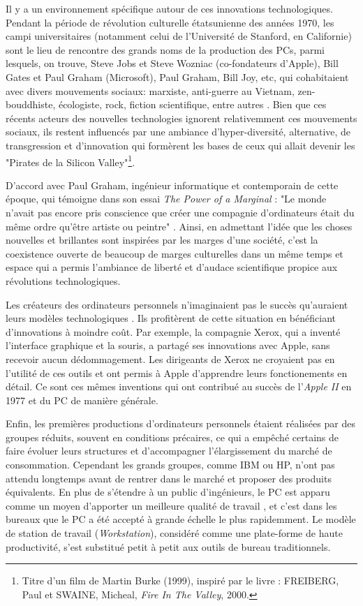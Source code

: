 Il y a un environnement spécifique autour de ces innovations technologiques. Pendant la période de révolution culturelle étatsunienne des années 1970, les campi universitaires (notamment celui de l'Université de Stanford, en Californie) sont le lieu de rencontre des grands noms de la production des PCs, parmi lesquels, on trouve, Steve Jobs et Steve Wozniac (co-fondateurs d'Apple), Bill Gates et Paul Graham (Microsoft), Paul Graham, Bill Joy, etc, qui cohabitaient avec divers mouvements sociaux: marxiste, anti-guerre au Vietnam, zen-bouddhiste, écologiste, rock, fiction scientifique, entre autres \citep{Breton1990}. Bien que ces récents acteurs des nouvelles technologies ignorent relativemment ces mouvements sociaux, ils restent influencés par une ambiance d'hyper-diversité, alternative, de transgression et d'innovation qui formèrent les bases de ceux qui allait devenir les "Pirates de la Silicon Valley"\footnote{Titre d'un film de Martin Burke (1999), inspiré par le livre : FREIBERG, Paul et SWAINE, Micheal, \emph{Fire In The Valley}, 2000.}.

D'accord avec Paul Graham, ingénieur informatique et contemporain de cette époque, qui témoigne dans son essai \emph{The Power of a Marginal} : "Le monde n'avait pas encore pris conscience que créer une compagnie d'ordinateurs était du même ordre qu'être artiste ou peintre" \citep{Graham2006}. Ainsi, en admettant l'idée que les choses nouvelles et brillantes sont inspirées par les marges d'une société, c'est la coexistence ouverte de beaucoup de marges culturelles dans un même temps et espace qui a permis l'ambiance de liberté et d'audace scientifique propice aux révolutions technologiques.

Les créateurs des ordinateurs personnels n'imaginaient pas le succès qu'auraient leurs modèles technologiques \citep{Negroponte1996}. Ils profitèrent de cette situation en bénéficiant d'innovations à moindre coût. Par exemple, la compagnie Xerox, qui a inventé l'interface graphique et la souris, a partagé ses innovations avec Apple, sans recevoir aucun dédommagement. Les dirigeants de Xerox ne croyaient pas en l'utilité de ces outils et ont permis à Apple d'apprendre leurs fonctionements en détail. Ce sont ces mêmes inventions qui ont contribué au succès de l'\emph{Apple II} en 1977 et du PC de manière générale.

Enfin, les premières productions d'ordinateurs personnels étaient réalisées par des groupes réduits, souvent en conditions précaires, ce qui a empêché certains de faire évoluer leurs structures et d'accompagner l'élargissement du marché de consommation. Cependant les grands groupes, comme IBM ou HP, n'ont pas attendu longtemps avant de rentrer dans le marché et proposer des produits équivalents. En  plus de s'étendre à un public d'ingénieurs, le PC est apparu comme un moyen d'apporter un meilleure qualité de travail \citep{Toffler1985}, et c'est dans les bureaux que le PC a été accepté à grande échelle le plus rapidemment. Le modèle de station de travail (\emph{Workstation}), considéré comme une plate-forme de haute productivité, s'est substitué petit à petit aux outils de bureau traditionnels.

